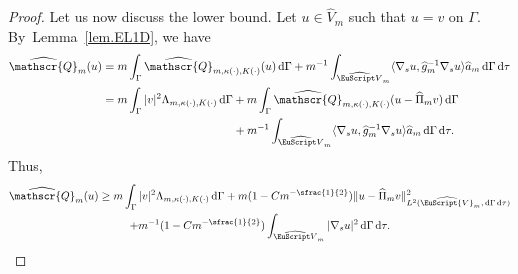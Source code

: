 \documentclass[10pt]{amsart}
\let\mathcal \EuScript
\newcommand{\scrQ}{\mathscr{Q}}
\newcommand{\cV}{\mathcal{V}}
\theoremstyle{plain}
\theoremstyle{definition}
\newcommand{\dx}{\mathrm{\,d}}
\begin{document}
\begin{proof}
Let us now discuss the lower bound. Let $u\in \widehat{V}_m$ such that $u = v$ on $\Gamma$.
By~Lem\-ma~\ref{lem.EL1D}, we have\
\[\begin{split}
\widehat{\scrQ}_m(u) &= m\int_\Gamma \widehat{\scrQ}_{m,\kappa(\cdot),K(\cdot)}(u)\dx \Gamma
+m^{-1}\int_{\widehat{\mathcal V}_{m}}\langle\nabla_{s} u,\widehat g^{-1}_m\nabla_{s} u\rangle\widehat a_m \dx \Gamma \dx\tau
\\
&
= m\int_\Gamma |v|^2\Lambda_{m,\kappa(\cdot),K(\cdot)}\dx \Gamma
+m\int_\Gamma \widehat{\scrQ}_{m,\kappa(\cdot),K(\cdot)}(u-\widehat{\Pi}_m v)\dx \Gamma
\\
&
\hspace*{4cm}+m^{-1}\int_{\widehat{\mathcal V}_{m}}\langle\nabla_{s} u,\widehat g^{-1}_m\nabla_{s} u\rangle\widehat a_m \dx \Gamma \dx\tau.
\end{split}\]
Thus,
\begin{multline}\label{eq:lemboundext8}
\widehat{\scrQ}_m(u)\geq m\int_\Gamma |v|^2\Lambda_{m,\kappa(\cdot),K(\cdot)}\dx \Gamma+m(1-Cm^{-\sfrac{1}{2}})\|u-\widehat{\Pi}_mv\|^2_{L^2(\widehat{\cV}_m, \dx\Gamma\dx\tau)} \\
+m^{-1}(1 - Cm^{-\sfrac{1}{2}})\int_{\widehat{\mathcal V}_{m}}|\nabla_s u|^2 \dx \Gamma \dx\tau.
\end{multline}


\end{proof}
\end{document}
